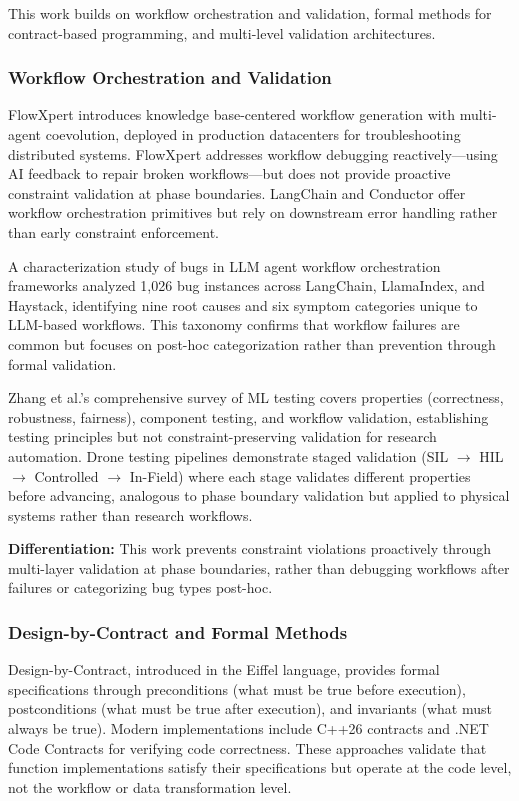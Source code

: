 
This work builds on workflow orchestration and validation, formal methods for contract-based programming, and multi-level validation architectures.

\subsubsection{Workflow Orchestration and Validation}

FlowXpert introduces knowledge base-centered workflow generation with multi-agent coevolution, deployed in production datacenters for troubleshooting distributed systems. FlowXpert addresses workflow debugging reactively---using AI feedback to repair broken workflows---but does not provide proactive constraint validation at phase boundaries. LangChain and Conductor offer workflow orchestration primitives but rely on downstream error handling rather than early constraint enforcement.

A characterization study of bugs in LLM agent workflow orchestration frameworks analyzed 1,026 bug instances across LangChain, LlamaIndex, and Haystack, identifying nine root causes and six symptom categories unique to LLM-based workflows. This taxonomy confirms that workflow failures are common but focuses on post-hoc categorization rather than prevention through formal validation.

Zhang et al.'s comprehensive survey of ML testing covers properties (correctness, robustness, fairness), component testing, and workflow validation, establishing testing principles but not constraint-preserving validation for research automation. Drone testing pipelines demonstrate staged validation (SIL $\rightarrow$ HIL $\rightarrow$ Controlled $\rightarrow$ In-Field) where each stage validates different properties before advancing, analogous to phase boundary validation but applied to physical systems rather than research workflows.

\textbf{Differentiation:} This work prevents constraint violations proactively through multi-layer validation at phase boundaries, rather than debugging workflows after failures or categorizing bug types post-hoc.

\subsubsection{Design-by-Contract and Formal Methods}

Design-by-Contract, introduced in the Eiffel language, provides formal specifications through preconditions (what must be true before execution), postconditions (what must be true after execution), and invariants (what must always be true). Modern implementations include C++26 contracts and .NET Code Contracts for verifying code correctness. These approaches validate that function implementations satisfy their specifications but operate at the code level, not the workflow or data transformation level.

